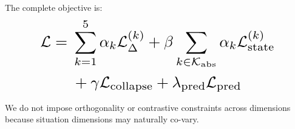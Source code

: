 \documentclass[11pt]{article}
\begin{document}
The complete objective is:
\begin{equation}
\resizebox{0.80\columnwidth}{!}{$\displaystyle
\begin{aligned}
\mathcal{L}
={}&
\sum_{k=1}^{5}\alpha_k\mathcal{L}_{\Delta}^{(k)}
+
\beta\sum_{k\in\mathcal{K}_{\mathrm{abs}}}
\alpha_k\mathcal{L}_{\mathrm{state}}^{(k)}
\\
&+
\gamma\mathcal{L}_{\mathrm{collapse}}
+
\lambda_{\mathrm{pred}}\mathcal{L}_{\mathrm{pred}}
\end{aligned}
$}
\end{equation}

We do not impose orthogonality or contrastive constraints across dimensions because situation dimensions may naturally co-vary.
\end{document}
